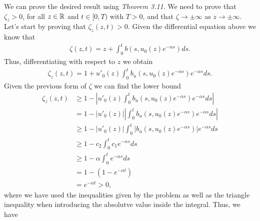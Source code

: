 \begin{questions}

\begin{solution}
We can prove the desired result using \textsl{Theorem 3.11}. We need to prove that $\zeta_z>0$, for all $z\in\mathbb{R}$ and $t\in[0,T)$ with $T>0$, and that $\zeta\rightarrow\pm\infty$ as $z\rightarrow\pm\infty$. Let's start by proving that $\zeta_z(z,t)>0$. Given the differential equation above we know that
\begin{align*}
\zeta(z,t)=z+\int_0^tb\left(s,u_0(z)e^{-\alpha s}\right)ds.
\end{align*}
Thus, differentiating with respect to $z$ we obtain
\begin{align*}
\zeta_z(z,t)=1+u'_0(z)\int_0^tb_u\left(s,u_0(z)e^{-\alpha s}\right)e^{-\alpha s}ds.
\end{align*}
Given the previous form of $\zeta$ we can find the lower bound
\begin{align*}
\zeta_z(z,t)&\geq 1-\left|u'_0(z)\int_0^tb_u\left(s,u_0(z)e^{-\alpha s}\right)e^{-\alpha s}ds\right|\\
&=1-\left|u'_0(z)\right|\left|\int_0^tb_u\left(s,u_0(z)e^{-\alpha s}\right)e^{-\alpha s}ds\right|\\
&\geq 1-\left|u'_0(z)\right|\int_0^t\left|b_u\left(s,u_0(z)e^{-\alpha s}\right)\right|e^{-\alpha s}ds\\
&\geq 1-c_2\int_0^tc_1e^{-\alpha s}ds\\
&\geq 1-\alpha\int_0^te^{-\alpha s}ds\\
&=1-\left(1-e^{-\alpha t}\right)\\
&=e^{-\alpha t}>0,
\end{align*}
where we have used the inequalities given by the problem as well as the triangle inequality when introducing the absolutve value inside the integral. Thus, we have
\begin{align*}

\end{align*}
\end{solution}
\end{questions}
